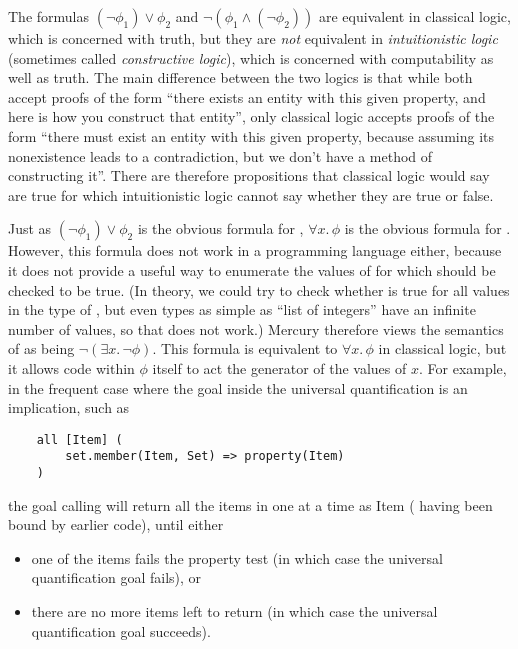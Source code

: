 The formulas
$(\lnot \phi_1) \lor \phi_2$ and
$\lnot (\phi_1 \land (\lnot \phi_2))$
are equivalent in classical logic,
which is concerned with truth,
but they are \emph{not} equivalent in \emph{intuitionistic logic}
(sometimes called \emph{constructive logic}),
which is concerned with computability as well as truth.
The main difference between the two logics is that
while both accept proofs of the form
``there exists an entity with this given property,
and here is how you construct that entity'',
only classical logic accepts proofs of the form
``there must exist an entity with this given property,
because assuming its nonexistence leads to a contradiction,
but we don't have a method of constructing it''.
There are therefore propositions
that classical logic would say are true
for which intuitionistic logic cannot say whether they are true or false.

Just as $(\lnot \phi_1) \lor \phi_2$ is the obvious formula
for ,
$\forall x.\, \phi$ is the obvious formula for .
However, this formula does not work in a programming language either,
because it does not provide a useful way
to enumerate the values of 
for which  should be checked to be true.
(In theory, we could try to check whether
 is true for all values in the type of ,
but even types as simple as ``list of integers''
have an infinite number of values,
so that does not work.)
Mercury therefore views the semantics of 
as being $\lnot (\exists x.\, \lnot \phi)$.
This formula is equivalent to $\forall x.\, \phi$ in classical logic,
but it allows code within $\phi$ itself
to act the generator of the values of $x$.
For example, in the frequent case
where the goal inside the universal quantification is an implication,
such as
\begin{verbatim}
    all [Item] (
        set.member(Item, Set) => property(Item)
    )
\end{verbatim}
the goal calling 
will return all the items in  one at a time as Item
( having been bound by earlier code),
until either
\begin{itemize}
\item
one of the items fails the property test
(in which case the universal quantification goal fails), or
\item
there are no more items left to return
(in which case the universal quantification goal succeeds).
\end{itemize}

